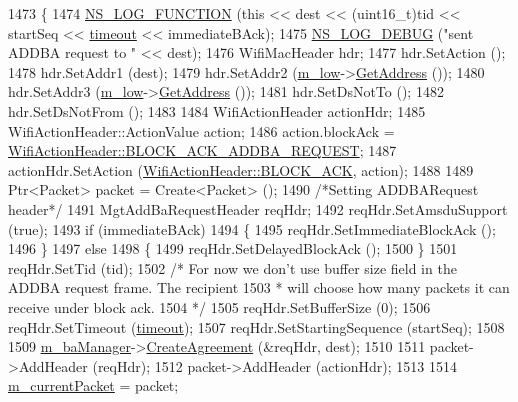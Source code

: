 \begin{DoxyCode}
1473 \{
1474   \hyperlink{log-macros-disabled_8h_a90b90d5bad1f39cb1b64923ea94c0761}{NS\_LOG\_FUNCTION} (\textcolor{keyword}{this} << dest << (uint16\_t)tid << startSeq << 
      \hyperlink{openflow-switch_8cc_a386d174ae121d1cfa279074b7e209714}{timeout} << immediateBAck);
1475   \hyperlink{group__logging_ga413f1886406d49f59a6a0a89b77b4d0a}{NS\_LOG\_DEBUG} (\textcolor{stringliteral}{"sent ADDBA request to "} << dest);
1476   WifiMacHeader hdr;
1477   hdr.SetAction ();
1478   hdr.SetAddr1 (dest);
1479   hdr.SetAddr2 (\hyperlink{classns3_1_1DcaTxop_a76de11e512290acc37c9863f7ab17758}{m\_low}->\hyperlink{classns3_1_1MacLow_a109922d4f2bb1ee0b2a66aa3bcc48e2f}{GetAddress} ());
1480   hdr.SetAddr3 (\hyperlink{classns3_1_1DcaTxop_a76de11e512290acc37c9863f7ab17758}{m\_low}->\hyperlink{classns3_1_1MacLow_a109922d4f2bb1ee0b2a66aa3bcc48e2f}{GetAddress} ());
1481   hdr.SetDsNotTo ();
1482   hdr.SetDsNotFrom ();
1483 
1484   WifiActionHeader actionHdr;
1485   WifiActionHeader::ActionValue action;
1486   action.blockAck = \hyperlink{classns3_1_1WifiActionHeader_a575d216d28074b8e5fc25d17692f6962aae76baa0c4e02e79e3d69f7d926cc27d}{WifiActionHeader::BLOCK\_ACK\_ADDBA\_REQUEST};
1487   actionHdr.SetAction (\hyperlink{classns3_1_1WifiActionHeader_a5402becd11b4077f22d76c4d0d923358ae1954449580715d3d737a12739923ef2}{WifiActionHeader::BLOCK\_ACK}, action);
1488 
1489   Ptr<Packet> packet = Create<Packet> ();
1490   \textcolor{comment}{/*Setting ADDBARequest header*/}
1491   MgtAddBaRequestHeader reqHdr;
1492   reqHdr.SetAmsduSupport (\textcolor{keyword}{true});
1493   \textcolor{keywordflow}{if} (immediateBAck)
1494     \{
1495       reqHdr.SetImmediateBlockAck ();
1496     \}
1497   \textcolor{keywordflow}{else}
1498     \{
1499       reqHdr.SetDelayedBlockAck ();
1500     \}
1501   reqHdr.SetTid (tid);
1502   \textcolor{comment}{/* For now we don't use buffer size field in the ADDBA request frame. The recipient}
1503 \textcolor{comment}{   * will choose how many packets it can receive under block ack.}
1504 \textcolor{comment}{   */}
1505   reqHdr.SetBufferSize (0);
1506   reqHdr.SetTimeout (\hyperlink{openflow-switch_8cc_a386d174ae121d1cfa279074b7e209714}{timeout});
1507   reqHdr.SetStartingSequence (startSeq);
1508 
1509   \hyperlink{classns3_1_1EdcaTxopN_a7a79eaafe03995bb274451aa752b83b2}{m\_baManager}->\hyperlink{classns3_1_1BlockAckManager_a44483ff8e6011faf1190dc0f178e66b7}{CreateAgreement} (&reqHdr, dest);
1510 
1511   packet->AddHeader (reqHdr);
1512   packet->AddHeader (actionHdr);
1513 
1514   \hyperlink{classns3_1_1DcaTxop_a3c454c21337aac0944f86caad8b7a719}{m\_currentPacket} = packet;

\end{DoxyCode}
